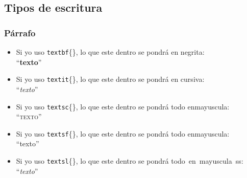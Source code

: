 \documentclass[12pt,a4paper]{article}
\begin{document}
\subsection{Tipos de escritura}
\subsubsection*{Párrafo}

\begin{itemize}
\item Si yo uso \texttt{textbf}\{\}, lo que este dentro se pondrá en negrita:\\``\textbf{texto}''

\item Si yo uso \texttt{textit}\{\}, lo que este dentro se pondrá en cursiva:\\``\textit{texto}''

\item Si yo uso \texttt{textsc}\{\}, lo que este dentro se pondrá todo en\linebreak mayuscula:\\``\textsc{texto}''

\item Si yo uso \texttt{textsf}\{\}, lo que este dentro se pondrá todo en\linebreak mayuscula:\\``\textsf{texto}''

\item Si yo uso \texttt{textsl}\{\}, lo que este dentro se pondrá todo~en~mayuscula~ss:\\``\textsl{texto}''

\end{itemize}
\end{document}
